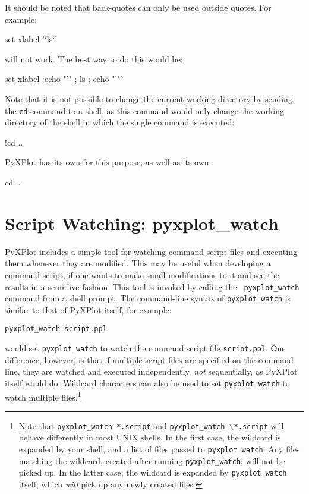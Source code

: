 It should be noted that back-quotes can only be used outside quotes. For
example:

\begin{dontdo}
set xlabel '`ls`'
\end{dontdo}

\noindent will not work. The best way to do this would be:

\begin{dodo}
set xlabel `echo "'" ; ls ; echo "'"`
\end{dodo}

Note that it is not possible to change the current working directory by sending
the {\tt cd} command to a shell, as this command would only change the working
directory of the shell in which the single command is executed:

\begin{dontdo}
!cd ..
\end{dontdo}

PyXPlot has its own  for this purpose, as well as its own
:

\begin{dodo}
cd ..
\end{dodo}

\section{Script Watching: pyxplot\_watch}

PyXPlot includes a simple tool for watching command script files and executing
them whenever they are modified. This may be useful when developing a command
script, if one wants to make small modifications to it and see the results in a
semi-live fashion. This tool is invoked by calling the {\tt
pyxplot\_watch} command from a
shell prompt. The command-line syntax of {\tt pyxplot\_watch} is similar to
that of PyXPlot itself, for example:

\begin{verbatim}
pyxplot_watch script.ppl
\end{verbatim}

\noindent would set {\tt pyxplot\_watch} to watch the command script file
{\tt script.ppl}. One difference, however, is that if multiple script files are
specified on the command line, they are watched and executed independently,
\textit{not} sequentially, as PyXPlot itself would do. Wildcard characters can
also be used to set {\tt pyxplot\_watch} to watch multiple
files.\footnote{Note that {\tt pyxplot\_watch *.script} and
{\tt pyxplot\_watch $\backslash$*.script} will behave differently in most
UNIX shells.  In the first case, the wildcard is expanded by your shell, and a
list of files passed to {\tt pyxplot\_watch}. Any files matching the
wildcard, created after running {\tt pyxplot\_watch}, will not be picked up.
In the latter case, the wildcard is expanded by {\tt pyxplot\_watch} itself,
which {\it will} pick up any newly created files.}

